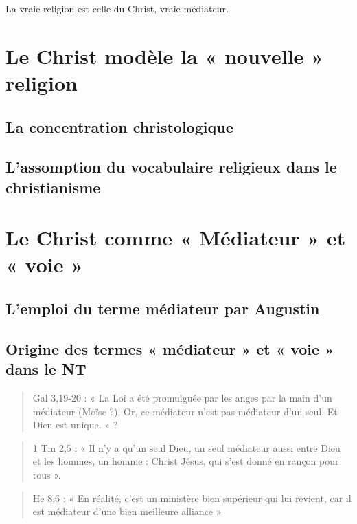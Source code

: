 La vraie religion est celle du Christ, vraie médiateur.

\section{Le Christ modèle la « nouvelle » religion  }


\subsection{La concentration christologique}


\subsection{L’assomption du vocabulaire religieux dans le christianisme }
 
\section{Le Christ comme « Médiateur » et « voie » }


\subsection{L’emploi du terme médiateur par Augustin}


\subsection{Origine des termes  « médiateur » et  « voie » dans le NT}

\begin{quote}
    Gal 3,19-20 : « La Loi a été promulguée par les anges par la main d’un médiateur (Moïse ?). Or, ce médiateur n’est pas médiateur d’un seul. Et Dieu est unique. » ? 
\end{quote}

\begin{quote}
    1 Tm 2,5 : « Il n’y a qu’un seul Dieu, un seul médiateur aussi entre Dieu et les hommes, un homme : Christ Jésus, qui s’est donné en rançon pour tous ».  
\end{quote}
\begin{quote}
    He 8,6 : « En réalité, c’est un ministère bien supérieur qui lui revient, car il est médiateur d’une bien meilleure alliance »  
\end{quote}

